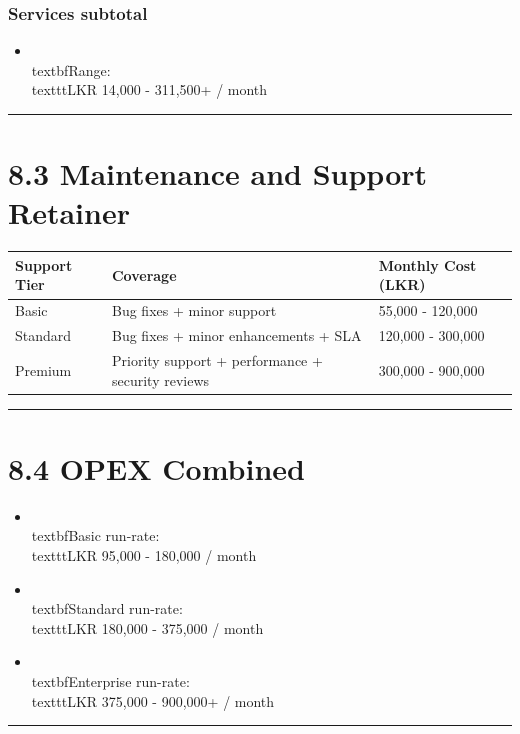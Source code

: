 \documentclass[11pt,a4paper]{article}
\begin{document}
\subsubsection{Services subtotal}

\begin{itemize}
\item \\textbf{Range:} \\texttt{LKR 14,000 - 311,500+ / month}
\end{itemize}

\bigskip\hrule\bigskip

\section{8.3 Maintenance and Support Retainer}

\begin{longtable}{p{} | p{} | p{}}
\toprule
Support Tier & Coverage & Monthly Cost (LKR) \\
\midrule
Basic & Bug fixes + minor support & 55,000 - 120,000 \\
Standard & Bug fixes + minor enhancements + SLA & 120,000 - 300,000 \\
Premium & Priority support + performance + security reviews & 300,000 - 900,000 \\
\bottomrule
\end{longtable}

\bigskip\hrule\bigskip

\section{8.4 OPEX Combined}

\begin{itemize}
\item \\textbf{Basic run-rate:} \\texttt{LKR 95,000 - 180,000 / month}
\item \\textbf{Standard run-rate:} \\texttt{LKR 180,000 - 375,000 / month}
\item \\textbf{Enterprise run-rate:} \\texttt{LKR 375,000 - 900,000+ / month}
\end{itemize}

\bigskip\hrule\bigskip
\end{document}
